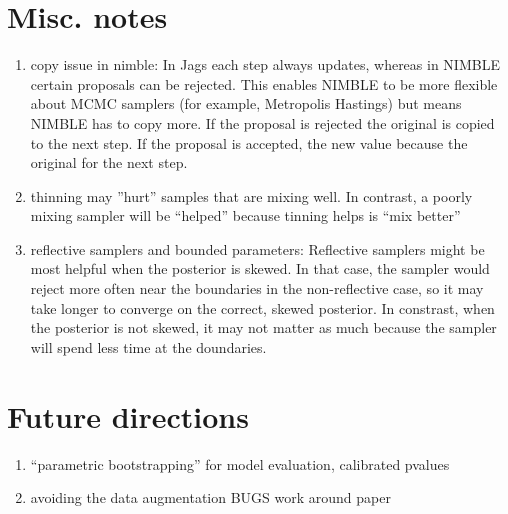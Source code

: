 \documentclass[12pt]{article}
\begin{document}
\section{Misc. notes}
\begin{enumerate}
\item copy issue in nimble:  In Jags each step always updates, whereas
  in NIMBLE certain proposals can be rejected. This enables NIMBLE to
  be more flexible about MCMC samplers (for example, Metropolis
  Hastings) but means NIMBLE has to copy more. If the proposal is
  rejected the original is copied to the next step. If the proposal is
  accepted, the new value because the original for the next step.
\item thinning may ''hurt'' samples that are mixing well. In contrast,
  a poorly mixing sampler will be ``helped'' because tinning helps is
  ``mix better''
\item reflective samplers and bounded parameters: Reflective samplers
  might be most helpful when the posterior is skewed. In that case,
  the sampler would reject more often near the boundaries in the
  non-reflective case, so it may take longer to converge on the
  correct, skewed posterior. In constrast, when the posterior is not
  skewed, it may not matter as much because the sampler will spend
  less time at the doundaries.
\end{enumerate}


\section{Future directions}
\begin{enumerate}
\item ``parametric bootstrapping'' for model evaluation, calibrated
  pvalues
\item avoiding the data augmentation BUGS work around paper
\end{enumerate}
\end{document}
